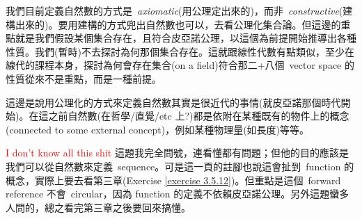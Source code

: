 \begin{remark}\label{remark 2.1.14}
我們目前定義自然數的方式是\ \emph{axiomatic}(用公理定出來的)，而非\ \emph{constructive}(建構出來的)。要用建構的方式兜出自然數也可以，去看公理化集合論。但這邊的重點就是我們假設某個集合存在，且符合皮亞諾公理，以這個為前提開始推導出各種性質。我們(暫時)不去探討為何那個集合存在。這就跟線性代數有點類似，至少在線代的課程本身，探討為何會存在集合(on a field)符合那二+八個\ vector space 的性質從來不是重點，而是一種前提。
\end{remark}

\begin{remark}\label{remark 2.1.15}
這邊是說用公理化的方式來定義自然數其實是很近代的事情(就皮亞諾那個時代開始)。在這之前自然數(在哲學/直覺/etc 上?)都是依附在某種既有的物件上的概念(connected to some external concept)，例如某種物理量(如長度)等等。
\end{remark}

\begin{proposition}\label{prop 2.1.16}
\textcolor{red}{I don't know all this shit} 這題我完全問號，連看懂都有問題；但他的目的應該是我們可以從自然數來定義\ sequence。可是這一頁的註腳也說這會扯到\ function 的概念，實際上要去看第三章(Exercise \ref{exercise 3.5.12})。但重點是這個\ forward reference 不會\ circular，因為 function 的定義不依賴皮亞諾公理。另外這題蠻多人問的，總之看完第三章之後要回來搞懂。
\end{proposition}